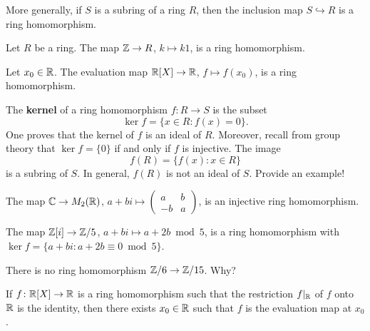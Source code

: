 More generally, if $S$ is a subring of a ring $R$, then the inclusion map 
$S\hookrightarrow R$ is a ring homomorphism. 

\begin{example}
Let $R$ be a ring. 
The map $\mathbb{Z}\to R$, $k\mapsto k1$, is a ring homomorphism. 	
\end{example}

\begin{example}
Let $x_0\in\mathbb{R}$. The evaluation map $\mathbb{R}[X]\to\mathbb{R}$, $f\mapsto f(x_0)$, 
is a ring homomorphism. 	
\end{example}

The \textbf{kernel} of a ring homomorphism
$f\colon R\to S$ is the subset
\[
\ker f=\{x\in R:f(x)=0\}.
\]
One proves that the kernel of $f$ is an ideal of $R$.  
Moreover, recall from group theory that 
$\ker f=\{0\}$ if and only if $f$ is injective. The image 
\[
f(R)=\{f(x):x\in R\}
\]
is a subring of $S$. In general, $f(R)$ is not an ideal of $S$. Provide an example! 

\begin{example}
	The map $\mathbb{C}\to M_2(\mathbb{R})$, $a+bi\mapsto\begin{pmatrix}a&b\\-b&a\end{pmatrix}$, is an injective
	ring homomorphism. 	
\end{example}

\begin{example}
The map $\mathbb{Z}[i]\to\mathbb{Z}/5$, $a+bi\mapsto a+2b\bmod 5$, is a ring homomorphism 
with $\ker f=\{a+bi:a+2b\equiv 0\bmod 5\}$. 	
\end{example}

\begin{exercise}
There is no ring homomorphism $\mathbb{Z}/6\to\mathbb{Z}/15$. Why?	
\end{exercise}

\begin{exercise}
If $f\colon\mathbb{R}[X]\to\mathbb{R}$ is a ring homomorphism 
such that the restriction $f|_{\mathbb{R}}$ of 
$f$ onto $\mathbb{R}$ is the identity, then there exists $x_0\in\mathbb{R}$ such that 
$f$ is the evaluation map at $x_0$. 
\end{exercise}

